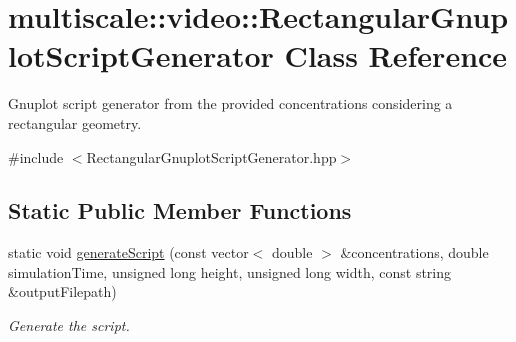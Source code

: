 \hypertarget{classmultiscale_1_1video_1_1RectangularGnuplotScriptGenerator}{\section{multiscale\-:\-:video\-:\-:\-Rectangular\-Gnuplot\-Script\-Generator \-Class \-Reference}
\label{classmultiscale_1_1video_1_1RectangularGnuplotScriptGenerator}
}


\-Gnuplot script generator from the provided concentrations considering a rectangular geometry.  




{\ttfamily \#include $<$\-Rectangular\-Gnuplot\-Script\-Generator.\-hpp$>$}

\subsection*{\-Static \-Public \-Member \-Functions}
\begin{DoxyCompactItemize}
\item 
static void \hyperlink{classmultiscale_1_1video_1_1RectangularGnuplotScriptGenerator_a8a2e69a85d54df5bacd2e18d27993c14}{generate\-Script} (const vector$<$ double $>$ \&concentrations, double simulation\-Time, unsigned long height, unsigned long width, const string \&output\-Filepath)
\begin{DoxyCompactList}\small\item\em \-Generate the script. \end{DoxyCompactList}\end{DoxyCompactItemize}
